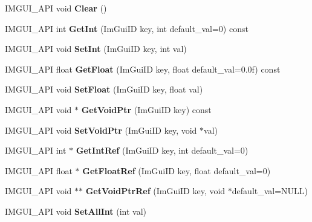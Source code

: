 \begin{DoxyCompactItemize}
\item 
\mbox{\label{struct_im_gui_storage_af101b92fdad15b58318ca5494dccf197}} 
I\+M\+G\+U\+I\+\_\+\+A\+PI void {\bfseries Clear} ()
\item 
\mbox{\label{struct_im_gui_storage_afb6bcd1009cd95bd897b21e2b56d7e04}} 
I\+M\+G\+U\+I\+\_\+\+A\+PI int {\bfseries Get\+Int} (Im\+Gui\+ID key, int default\+\_\+val=0) const
\item 
\mbox{\label{struct_im_gui_storage_a4f39e27cfdce4f28df4a1776f769b27f}} 
I\+M\+G\+U\+I\+\_\+\+A\+PI void {\bfseries Set\+Int} (Im\+Gui\+ID key, int val)
\item 
\mbox{\label{struct_im_gui_storage_a80289c0435f644e0d3ac977a18491c9a}} 
I\+M\+G\+U\+I\+\_\+\+A\+PI float {\bfseries Get\+Float} (Im\+Gui\+ID key, float default\+\_\+val=0.\+0f) const
\item 
\mbox{\label{struct_im_gui_storage_a04795ab17c018b604b960788bb09046f}} 
I\+M\+G\+U\+I\+\_\+\+A\+PI void {\bfseries Set\+Float} (Im\+Gui\+ID key, float val)
\item 
\mbox{\label{struct_im_gui_storage_a9ba8637d60c0cd6114c19bd06cf0e7fe}} 
I\+M\+G\+U\+I\+\_\+\+A\+PI void $\ast$ {\bfseries Get\+Void\+Ptr} (Im\+Gui\+ID key) const
\item 
\mbox{\label{struct_im_gui_storage_a2ea8ea6cdbf77e8f59fda585562fffee}} 
I\+M\+G\+U\+I\+\_\+\+A\+PI void {\bfseries Set\+Void\+Ptr} (Im\+Gui\+ID key, void $\ast$val)
\item 
\mbox{\label{struct_im_gui_storage_a645fb01d94e03fd4a8d508bef6f4d1bd}} 
I\+M\+G\+U\+I\+\_\+\+A\+PI int $\ast$ {\bfseries Get\+Int\+Ref} (Im\+Gui\+ID key, int default\+\_\+val=0)
\item 
\mbox{\label{struct_im_gui_storage_a28ee14c75a303df27a514ec934012533}} 
I\+M\+G\+U\+I\+\_\+\+A\+PI float $\ast$ {\bfseries Get\+Float\+Ref} (Im\+Gui\+ID key, float default\+\_\+val=0)
\item 
\mbox{\label{struct_im_gui_storage_a557d967b353a40f7371e742f8308b258}} 
I\+M\+G\+U\+I\+\_\+\+A\+PI void $\ast$$\ast$ {\bfseries Get\+Void\+Ptr\+Ref} (Im\+Gui\+ID key, void $\ast$default\+\_\+val=N\+U\+LL)
\item 
\mbox{\label{struct_im_gui_storage_a63b3da805f6f9820a4e293cfe723cb2e}} 
I\+M\+G\+U\+I\+\_\+\+A\+PI void {\bfseries Set\+All\+Int} (int val)
\end{DoxyCompactItemize}
